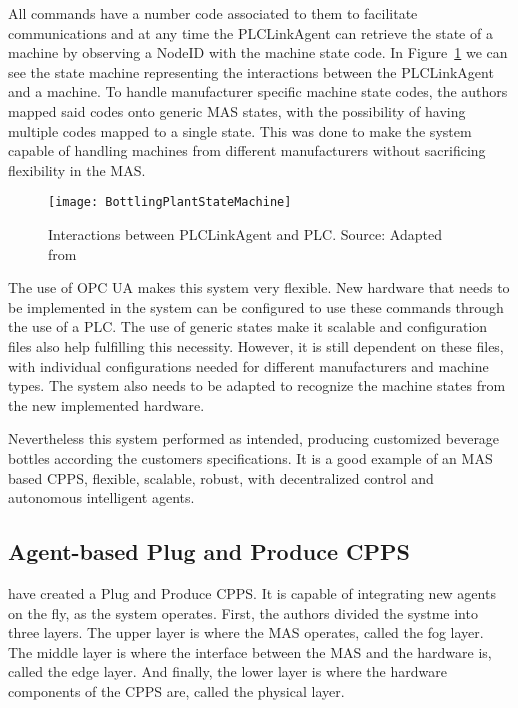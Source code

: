 All commands have a number code associated to them to facilitate communications and at any time the PLCLinkAgent can retrieve the state of a machine by observing a NodeID with the machine state code. In Figure~\ref{fig:bottling_plant_state_achine} we can see the state machine representing the interactions between the PLCLinkAgent and a machine. To handle manufacturer specific machine state codes, the authors mapped said codes onto generic MAS states, with the possibility of having multiple codes mapped to a single state. This was done to make the system capable of handling machines from different manufacturers without sacrificing flexibility in the MAS.

\begin{figure}[hbt!]
	\centering
	\texttt{[image: BottlingPlantStateMachine]}
	\caption{Interactions between PLCLinkAgent and PLC. Source: Adapted from \cite{bottling_plant_part2}}
	\label{fig:bottling_plant_state_achine}
\end{figure}

The use of OPC UA makes this system very flexible. New hardware that needs to be implemented in the system can be configured to use these commands through the use of a PLC. The use of generic states make it scalable and configuration files also help fulfilling this necessity. However, it is still dependent on these files, with individual configurations needed for different manufacturers and machine types. The system also needs to be adapted to recognize the machine states from the new implemented hardware.

Nevertheless this system performed as intended, producing customized beverage bottles according the customers specifications. It is a good example of an MAS based CPPS, flexible, scalable, robust, with decentralized control and autonomous intelligent agents.
 
\subsection{Agent-based Plug and Produce CPPS}
\label{agent_plug_and_produce}

\citeauthor{8972169} \cite{8972169} have created a Plug and Produce CPPS. It is capable of integrating new agents on the fly, as the system operates. First, the authors divided the systme into three layers. The upper layer is where the MAS operates, called the fog layer. The middle layer is where the interface between the MAS and the hardware is, called the edge layer. And finally, the lower layer is where the hardware components of the CPPS are, called the physical layer.\\

